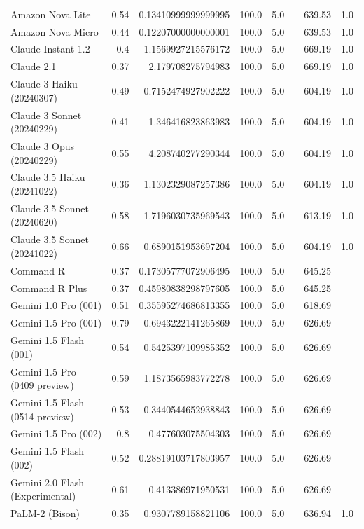 \begin{table}[htp]
{\begin{tabular}{lrrrrrrr}
Amazon Nova Lite & 0.54 & 0.13410999999999995 & 100.0 & 5.0 &  & 639.53 & 1.0 \\
Amazon Nova Micro & 0.44 & 0.12207000000000001 & 100.0 & 5.0 &  & 639.53 & 1.0 \\
Claude Instant 1.2 & 0.4 & 1.1569927215576172 & 100.0 & 5.0 &  & 669.19 & 1.0 \\
Claude 2.1 & 0.37 & 2.179708275794983 & 100.0 & 5.0 &  & 669.19 & 1.0 \\
Claude 3 Haiku (20240307) & 0.49 & 0.7152474927902222 & 100.0 & 5.0 &  & 604.19 & 1.0 \\
Claude 3 Sonnet (20240229) & 0.41 & 1.346416823863983 & 100.0 & 5.0 &  & 604.19 & 1.0 \\
Claude 3 Opus (20240229) & 0.55 & 4.208740277290344 & 100.0 & 5.0 &  & 604.19 & 1.0 \\
Claude 3.5 Haiku (20241022) & 0.36 & 1.1302329087257386 & 100.0 & 5.0 &  & 604.19 & 1.0 \\
Claude 3.5 Sonnet (20240620) & 0.58 & 1.7196030735969543 & 100.0 & 5.0 &  & 613.19 & 1.0 \\
Claude 3.5 Sonnet (20241022) & 0.66 & 0.6890151953697204 & 100.0 & 5.0 &  & 604.19 & 1.0 \\
Command R & 0.37 & 0.17305777072906495 & 100.0 & 5.0 &  & 645.25 &  \\
Command R Plus & 0.37 & 0.45980838298797605 & 100.0 & 5.0 &  & 645.25 &  \\
Gemini 1.0 Pro (001) & 0.51 & 0.35595274686813355 & 100.0 & 5.0 &  & 618.69 &  \\
Gemini 1.5 Pro (001) & 0.79 & 0.6943222141265869 & 100.0 & 5.0 &  & 626.69 &  \\
Gemini 1.5 Flash (001) & 0.54 & 0.5425397109985352 & 100.0 & 5.0 &  & 626.69 &  \\
Gemini 1.5 Pro (0409 preview) & 0.59 & 1.1873565983772278 & 100.0 & 5.0 &  & 626.69 &  \\
Gemini 1.5 Flash (0514 preview) & 0.53 & 0.3440544652938843 & 100.0 & 5.0 &  & 626.69 &  \\
Gemini 1.5 Pro (002) & 0.8 & 0.477603075504303 & 100.0 & 5.0 &  & 626.69 &  \\
Gemini 1.5 Flash (002) & 0.52 & 0.28819103717803957 & 100.0 & 5.0 &  & 626.69 &  \\
Gemini 2.0 Flash (Experimental) & 0.61 & 0.413386971950531 & 100.0 & 5.0 &  & 626.69 &  \\
PaLM-2 (Bison) & 0.35 & 0.9307789158821106 & 100.0 & 5.0 &  & 636.94 & 1.0 \\

\end{tabular}}
\end{table}
